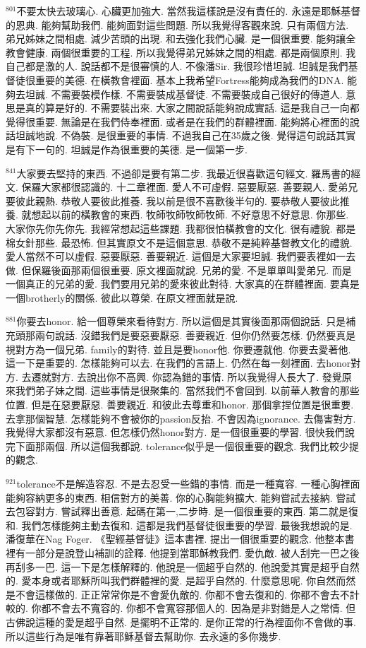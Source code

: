 \documentclass{book}
\begin{document}
$^{801}$不要太快去玻璃心.
心臟更加強大.
當然我這樣說是沒有責任的.
永遠是耶穌基督的恩典.
能夠幫助我們.
能夠面對這些問題.
所以我覺得客觀來說.
只有兩個方法.
弟兄姊妹之間相處.
減少苦頭的出現.
和去強化我們心臟.
是一個很重要.
能夠讓全教會健康.
兩個很重要的工程.
所以我覺得弟兄姊妹之間的相處.
都是兩個原則.
我自己都是激的人.
說話都不是很審慎的人.
不像潘Sir.
我很珍惜坦誠.
坦誠是我們基督徒很重要的美德.
在橫教會裡面.
基本上我希望Fortress能夠成為我們的DNA.
能夠去坦誠.
不需要裝模作樣.
不需要裝成基督徒.
不需要裝成自己很好的傳道人.
意思是真的算是好的.
不需要裝出來.
大家之間說話能夠說成實話.
這是我自己一向都覺得很重要.
無論是在我們侍奉裡面.
或者是在我們的群體裡面.
能夠將心裡面的說話坦誠地說.
不偽裝.
是很重要的事情.
不過我自己在35歲之後.
覺得這句說話其實是有下一句的.
坦誠是作為很重要的美德.
是一個第一步.

$^{841}$大家要去堅持的東西.
不過卻是要有第二步.
我最近很喜歡這句經文.
羅馬書的經文.
保羅大家都很認識的.
十二章裡面.
愛人不可虛假.
惡要厭惡.
善要親人.
愛弟兄要彼此親熱.
恭敬人要彼此推養.
我以前是很不喜歡後半句的.
要恭敬人要彼此推養.
就想起以前的橫教會的東西.
牧師牧師牧師牧師.
不好意思不好意思.
你那些.
大家你先你先你先.
我經常想起這些課題.
我都很怕橫教會的文化.
很有禮貌.
都是棉女針那些.
最恐怖.
但其實原文不是這個意思.
恭敬不是純粹基督教文化的禮貌.
愛人當然不可以虛假.
惡要厭惡.
善要親近.
這個是大家要坦誠.
我們要表裡如一去做.
但保羅後面那兩個很重要.
原文裡面就說.
兄弟的愛.
不是單單叫愛弟兄.
而是一個真正的兄弟的愛.
我們要用兄弟的愛來彼此對待.
大家真的在群體裡面.
要真是一個brotherly的關係.
彼此以尊榮.
在原文裡面就是說.

$^{881}$你要去honor.
給一個尊榮來看待對方.
所以這個是其實後面那兩個說話.
只是補充頭那兩句說話.
沒錯我們是要惡要厭惡.
善要親近.
但你仍然要怎樣.
仍然要真是視對方為一個兄弟.
family的對待.
並且是要honor他.
你要遷就他.
你要去愛著他.
這一下是重要的.
怎樣能夠可以去.
在我們的言語上.
仍然在每一刻裡面.
去honor對方.
去遷就對方.
去說出你不高興.
你認為錯的事情.
所以我覺得人長大了.
發覺原來我們弟子妹之間.
這些事情是很聚集的.
當然我們不會回到.
以前華人教會的那些位置.
但是在惡要厭惡.
善要親近.
和彼此去尊重和honor.
那個拿捏位置是很重要.
去拿那個智慧.
怎樣能夠不會被你的passion反抬.
不會因為ignorance.
去傷害對方.
我覺得大家都沒有惡意.
但怎樣仍然honor對方.
是一個很重要的學習.
很快我們說完下面那兩個.
所以這個我都說.
tolerance似乎是一個很重要的觀念.
我們比較少提的觀念.

$^{921}$tolerance不是解造容忍.
不是去忍受一些錯的事情.
而是一種寬容.
一種心胸裡面能夠容納更多的東西.
相信對方的美善.
你的心胸能夠擴大.
能夠嘗試去接納.
嘗試去包容對方.
嘗試釋出善意.
起碼在第一,二步時.
是一個很重要的東西.
第二就是復和.
我們怎樣能夠主動去復和.
這都是我們基督徒很重要的學習.
最後我想說的是.
潘復華在Nag Foger.
《聖經基督徒》這本書裡.
提出一個很重要的觀念.
他整本書裡有一部分是說登山補訓的詮釋.
他提到當耶穌教我們.
愛仇敵.
被人刮完一巴之後再刮多一巴.
這一下是怎樣解釋的.
他說是一個超乎自然的.
他說愛其實是超乎自然的.
愛本身或者耶穌所叫我們群體裡的愛.
是超乎自然的.
什麼意思呢.
你自然而然是不會這樣做的.
正正常常你是不會愛仇敵的.
你都不會去復和的.
你都不會去不計較的.
你都不會去不寬容的.
你都不會寬容那個人的.
因為是非對錯是人之常情.
但古佛說這種的愛是超乎自然.
是擺明不正常的.
是你正常的行為裡面你不會做的事.
所以這些行為是唯有靠著耶穌基督去幫助你.
去永遠的多你幾步.
\end{document}
